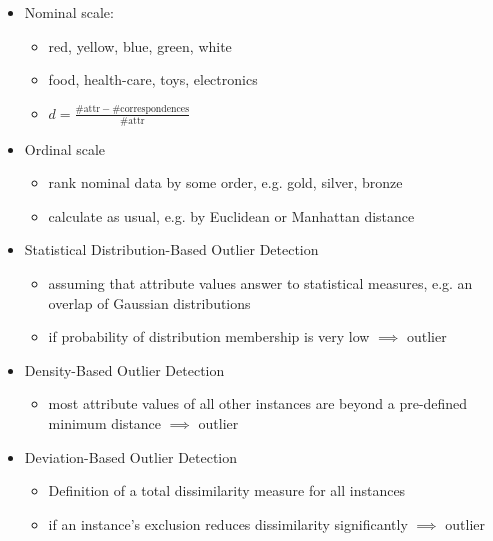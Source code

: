 \begin{breakbox}

\begin{itemize}
	\item Nominal scale:
		\begin{itemize}
			\item red, yellow, blue, green, white
			\item food, health-care, toys, electronics
			\item $d=\frac{\# \text{attr} - \# \text{correspondences}}{\# \text{attr}}$			
		\end{itemize}
	\item Ordinal scale
		\begin{itemize}
			\item rank nominal data by some order, e.g. gold, silver, bronze
			\item calculate as usual, e.g. by Euclidean or Manhattan distance
		\end{itemize}
\end{itemize}
\end{breakbox}


\begin{breakbox}

\begin{itemize}
	\item Statistical Distribution-Based Outlier Detection
		\begin{itemize}
			\item assuming that attribute values answer to statistical measures, e.g. an overlap of Gaussian distributions
			\item if probability of distribution membership is very low $\implies$ outlier		
		\end{itemize}
	\item Density-Based Outlier Detection
		\begin{itemize}
			\item most attribute values of all other instances are beyond a pre-defined minimum distance $\implies$ outlier
		\end{itemize}
	\item Deviation-Based Outlier Detection
		\begin{itemize}
			\item Definition of a total dissimilarity measure for all instances		
			\item if an instance's exclusion reduces dissimilarity significantly $\implies$ outlier
		\end{itemize}
\end{itemize}
\end{breakbox}



